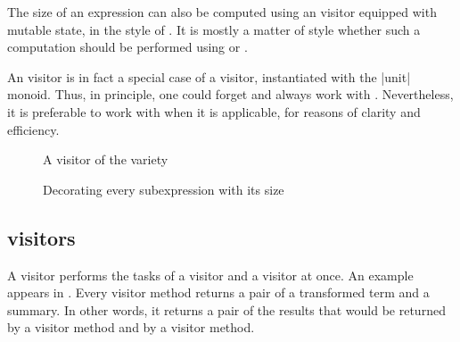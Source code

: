 \documentclass[11pt,a4paper,twoside]{article}
\begin{document}
The size of an expression can also be computed using an \iter visitor equipped
with mutable state, in the style of . It is mostly a matter
of style whether such a computation should be performed using \iter or
\reduce.

An \iter visitor is in fact a special case of a \reduce visitor, instantiated
with the \oc|unit| monoid. Thus, in principle, one could forget \iter and
always work with \reduce. Nevertheless, it is preferable to work with \iter
when it is applicable, for reasons of clarity and efficiency.



\begin{figure}[p]
\vspace{-\baselineskip}
\caption{A visitor of the \mapreduce variety}
\label{fig:mapreduce}
\end{figure}

\begin{figure}[p]
\caption{Decorating every subexpression with its size}
\label{fig:expr_info_mapreduce_use}
\end{figure}

\subsection{\mapreduce visitors}
\label{sec:intro:mapreduce}

A \mapreduce visitor performs the tasks of a \map visitor and a \reduce
visitor at once. An example appears in . Every visitor
method returns a pair of a transformed term and a summary. In other words,
it returns a pair of the results that would be returned by a \map visitor
method and by a \reduce visitor method.
\end{document}
